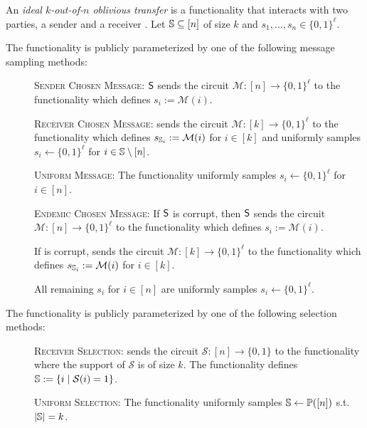 \begin{definition}\label{def:ot}
An \emph{ideal $k$-out-of-$n$ oblivious transfer} is a functionality that interacts with two parties, a sender \send and a receiver \rec. Let $\mathsf{\mathbb S}\subseteq[n]$ of size $k$ and  $s_1,...,s_n\in \{0,1\}^\ell$.

The functionality is publicly parameterized by one of the following message sampling methods:
\begin{description}
\item[] \textsc{Sender Chosen Message:} $\mathsf{S}$ sends the circuit $\mathcal{M} : [n] \rightarrow \{0,1\}^\ell$ to the functionality which defines $s_i:=\mathcal{M}(i)$.

\item[] \textsc{Receiver Chosen Message:} \rec sends the circuit  $\mathcal{M} : [k] \rightarrow \{0,1\}^\ell$ to the functionality which defines $s_{\mathsf{\mathbb S}_i}:=\mathcal{M}(i)$ for $i\in[k]$ and uniformly samples $s_i\gets\{0,1\}^\ell$ for $i\in\mathsf{\mathbb S}\setminus[n]$.

\item[] \textsc{Uniform Message:} The functionality uniformly samples $s_i\gets\{0,1\}^{\ell}$ for $i\in[n]$. 
 
\item[] \textsc{Endemic Chosen Message:} If $\mathsf{S}$ is corrupt, then $\mathsf{S}$ sends the circuit $\mathcal{M} : [n] \rightarrow \{0,1\}^\ell$ to the functionality which defines $s_i:=\mathcal{M}(i)$.

If \rec is corrupt, \rec sends the circuit  $\mathcal{M} : [k] \rightarrow \{0,1\}^\ell$ to the functionality which defines $s_{\mathsf{\mathbb S}_i}:=\mathcal{M}(i)$ for $i\in[k]$.

All remaining $s_i$ for $i\in [n]$ are uniformly samples $s_i\gets\{0,1\}^\ell$.
\end{description}

The functionality is publicly parameterized by one of the following selection methods:
\begin{description}
	\item[] \textsc{Receiver Selection:} \rec sends the circuit $\mathcal{S}:[n]\rightarrow\{0,1\}$ to the functionality where the support of $\mathcal{S}$ is of size $k$. The functionality defines $\mathsf{\mathbb S}:=\{i \mid \mathcal{S}(i)=1\}$.
	\item[] \textsc{Uniform Selection:} The functionality uniformly samples $\mathsf{\mathbb S}\gets\mathbb{P}([n])$ s.t. $|\mathsf{\mathbb S}|=k$.
\end{description}


\end{definition}
